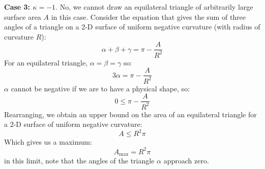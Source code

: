 \noindent \textbf{Case 3: $\kappa = -1$}. No, we cannot draw an equilateral triangle of arbitrarily large surface area $A$ in this case. Consider the equation that gives the sum of three angles of a triangle on a 2-D surface of uniform negative curvature (with radius of curvature $R$):
\begin{equation}
    \alpha + \beta + \gamma = \pi - \frac{A}{R^2}
\end{equation}
For an equilateral triangle, $\alpha = \beta = \gamma$ so:
\begin{equation}
    3\alpha = \pi - \frac{A}{R^2}
\end{equation}
$\alpha$ cannot be negative if we are to have a physical shape, so:
\begin{equation}
    0 \leq \pi - \frac{A}{R^2}
\end{equation}
Rearranging, we obtain an upper bound on the area of an equilateral triangle for a 2-D surface of uniform negative curvature:
\begin{equation}
   A \leq R^2\pi
\end{equation}
Which gives us a maximum:
\begin{equation}
    \boxed{A_{\text{max}} = R^2\pi}
\end{equation}
in this limit, note that the angles of the triangle $\alpha$ approach zero.

